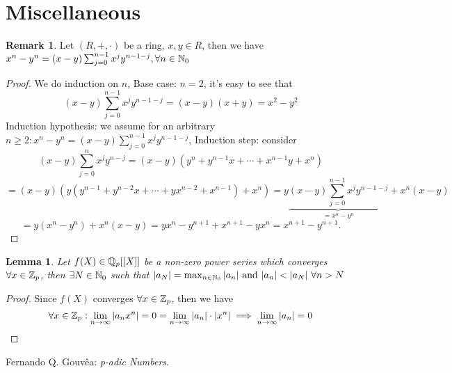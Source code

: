 \documentclass[a4paper]{article}
\theoremstyle{plain}
\newtheorem{lemm}[thm]{Lemma}
\theoremstyle{definition}
\newtheorem{rem}[thm]{Remark}
\begin{document}
\section{Miscellaneous}
\begin{rem} %
  Let $(R, +, \cdot)$ be a ring, $x, y \in R$, then we have $x^{n}-y^{n} = (x-y)\sum_{j=0}^{n-1}x^{j}y^{n-1-j}, \forall n \in \Bbb N_{0}$
\end{rem}
\begin{proof} %
  We do induction on $n$,
  Base case: $n = 2$, it's easy to see that
  $$(x-y)\sum_{j=0}^{n-1}x^{j}y^{n-1-j} = (x-y)(x+y) = x^{2} - y^{2}$$
  Induction hypothesis: we assume for an arbitrary $n \geq 2: x^{n}-y^{n} = (x-y)\sum_{j=0}^{n-1}x^{j}y^{n-1-j}$,
  Induction step: consider
  $$(x-y)\sum_{j=0}^{n}x^{j}y^{n-j} = (x-y)(y^{n} + y^{n-1}x + \cdots + x^{n-1}y + x^{n})$$
  $$ = (x-y)(y(y^{n-1} + y^{n-2}x + \cdots + yx^{n-2} + x^{n-1}) + x^{n}) = y\underbrace{(x-y)\sum_{j=0}^{n-1}x^{j}y^{n-1-j}}_{= x^{n}-y^{n}} + x^{n}(x-y)$$
  $$ = y(x^{n} - y^{n}) + x^{n}(x-y) = yx^{n} - y^{n+1} + x^{n+1} - yx^{n} = x^{n+1} - y^{n+1}.$$
\end{proof}
\begin{lemm}
  Let $f(X) \in \Bbb Q_{p}[[X]]$ be a non-zero power series which converges $\forall x \in \Bbb Z_{p}$, then $\exists N \in \Bbb N_{0}$ such that $|a_{N}| = \max_{n \in \Bbb N_{0}}|a_{n}| \text{ and } |a_{n}| < |a_{N}|\ \forall n > N$
\end{lemm}
\begin{proof}
  Since $f(X)$ converges $\forall x \in \Bbb Z_{p}$, then we have
  $$\forall x \in \Bbb Z_{p} : \lim_{n \to \infty}|a_{n}x^{n}| = 0 = \lim_{n \to \infty}|a_{n}|\cdot|x^{n}| \implies \lim_{n \to \infty}|a_{n}| = 0$$
\end{proof}
\begin{thebibliography}{widest-label} %

	Fernando Q. Gouv\^{e}a:
	\emph{p-adic Numbers}.
\end{thebibliography}
\end{document}
